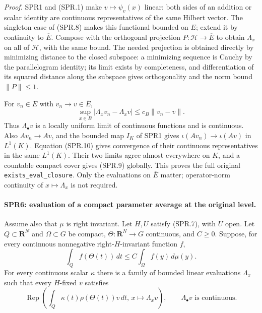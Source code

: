 \emph{Proof.}
SPR1 and (SPR.1) make \(v\mapsto\psi_v(x)\) linear:
both sides of an addition or scalar identity are continuous
representatives of the same Hilbert vector.
The singleton case of (SPR.8) makes this functional bounded on
\(E\); extend it by continuity to \(\overline E\).
Compose with the orthogonal projection
\(P:\mathcal H\to\overline E\) to obtain \(\Lambda_x\) on all of
\(\mathcal H\), with the same bound.
The needed projection is obtained directly by minimizing distance
to the closed subspace: a minimizing sequence is Cauchy by the
parallelogram identity; its limit exists by completeness, and
differentiation of its squared distance along the subspace gives
orthogonality and the norm bound \(\|P\|\le1\).

For \(v_n\in E\) with \(v_n\to v\in\overline E\),
\[
 \sup_{x\in B}|\Lambda_xv_n-\Lambda_xv|
                       \le c_B\|v_n-v\|.
 \tag{SPR.10}
\]
Thus \(\Lambda_\bullet v\) is a locally uniform limit of continuous
functions and is continuous.  Also \(Av_n\to Av\), and the bounded
map \(I_K\) of SPR1 gives
\(\iota(Av_n)\to\iota(Av)\) in \(L^1(K)\).
Equation (SPR.10) gives convergence of their continuous
representatives in the same \(L^1(K)\).
Their two limits agree almost everywhere on \(K\), and a countable
compact cover gives (SPR.9) globally.
This proves the full original \texttt{exists\_\allowbreak eval\_\allowbreak closure}.
Only the evaluations on \(\overline E\) matter; operator-norm
continuity of \(x\mapsto\Lambda_x\) is not required.

\paragraph{SPR6: evaluation of a compact parameter average at the original level.}
\label{claim:SPR6}
Assume also that \(\mu\) is right invariant.
Let \(H,U\) satisfy (SPR.7), with \(U\) open.
Let \(Q\subset\mathbf R^N\) and \(\Omega\subset G\) be compact,
\(\Theta:\mathbf R^N\to G\) continuous, and \(C\ge0\).
Suppose, for every continuous nonnegative right-\(H\)-invariant
function \(f\),
\[
             \int_Q f(\Theta(t))\,dt
                  \le C\int_\Omega f(y)\,d\mu(y).
 \tag{SPR.11}
\]
For every continuous scalar \(\kappa\) there is a family of bounded
linear evaluations \(\Lambda_x\) such that every \(H\)-fixed \(v\)
satisfies
\[
 \operatorname{Rep}\left(
       \int_Q\kappa(t)\rho(\Theta(t))v\,dt,\,
       x\longmapsto\Lambda_xv\right),
 \qquad \Lambda_\bullet v\text{ is continuous}.
 \tag{SPR.12}
\]

